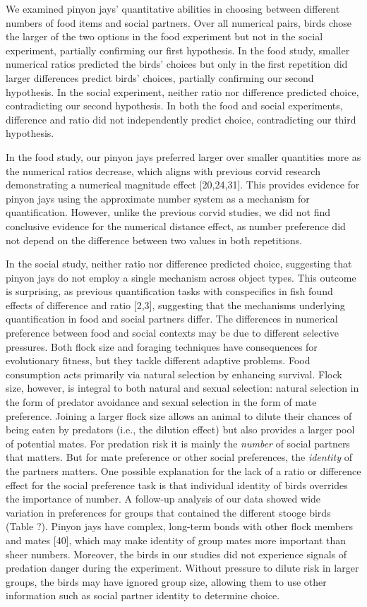 \documentclass[
  ,doc,floatsintext]{apa6}
\begin{document}
We examined pinyon jays' quantitative abilities in choosing between different numbers of food items and social partners. Over all numerical pairs, birds chose the larger of the two options in the food experiment but not in the social experiment, partially confirming our first hypothesis. In the food study, smaller numerical ratios predicted the birds' choices but only in the first repetition did larger differences predict birds' choices, partially confirming our second hypothesis. In the social experiment, neither ratio nor difference predicted choice, contradicting our second hypothesis. In both the food and social experiments, difference and ratio did not independently predict choice, contradicting our third hypothesis.

In the food study, our pinyon jays preferred larger over smaller quantities more as the numerical ratios decrease, which aligns with previous corvid research demonstrating a numerical magnitude effect {[}20,24,31{]}. This provides evidence for pinyon jays using the approximate number system as a mechanism for quantification. However, unlike the previous corvid studies, we did not find conclusive evidence for the numerical distance effect, as number preference did not depend on the difference between two values in both repetitions.

In the social study, neither ratio nor difference predicted choice, suggesting that pinyon jays do not employ a single mechanism across object types. This outcome is surprising, as previous quantification tasks with conspecifics in fish found effects of difference and ratio {[}2,3{]}, suggesting that the mechanisms underlying quantification in food and social partners differ. The differences in numerical preference between food and social contexts may be due to different selective pressures. Both flock size and foraging techniques have consequences for evolutionary fitness, but they tackle different adaptive problems. Food consumption acts primarily via natural selection by enhancing survival. Flock size, however, is integral to both natural and sexual selection: natural selection in the form of predator avoidance and sexual selection in the form of mate preference. Joining a larger flock size allows an animal to dilute their chances of being eaten by predators (i.e., the dilution effect) but also provides a larger pool of potential mates. For predation risk it is mainly the \emph{number} of social partners that matters. But for mate preference or other social preferences, the \emph{identity} of the partners matters. One possible explanation for the lack of a ratio or difference effect for the social preference task is that individual identity of birds overrides the importance of number. A follow-up analysis of our data showed wide variation in preferences for groups that contained the different stooge birds (Table ?). Pinyon jays have complex, long-term bonds with other flock members and mates {[}40{]}, which may make identity of group mates more important than sheer numbers. Moreover, the birds in our studies did not experience signals of predation danger during the experiment. Without pressure to dilute risk in larger groups, the birds may have ignored group size, allowing them to use other information such as social partner identity to determine choice.
\end{document}

